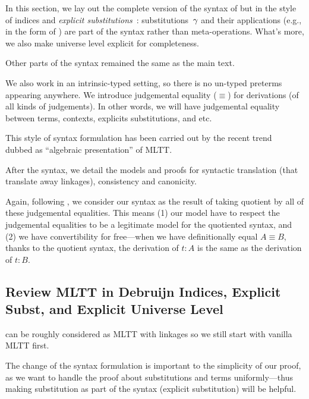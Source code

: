 In this section, we lay out the complete version of the syntax of \TT but in the style of \citeauthor{debruijn1964} indices and \emph{explicit substitutions}~\cite{substcalculus,abadi1989subst}:
substitutions~$\gamma$ and their applications (e.g., in the form of ) are part
of the syntax rather than meta-operations. What's more, we also make universe level explicit for completeness.

Other parts of the syntax remained the same as the main text.  

We also work in an intrinsic-typed setting, so there is no un-typed preterms appearing anywhere. We introduce judgemental equality ($\equiv$)
for derivations (of all kinds of judgements). In other words, we will have judgemental equality between terms, 
contexts, explicits substitutions, and etc. 

This style of syntax formulation has been carried out by the recent trend~\cite{altkap2016,coquand2018canonicity,gratzer-sterling-birkedal-2019} dubbed as ``algebraic presentation'' of MLTT. 


After the syntax, we detail the models and proofs for syntactic translation (that translate away linkages),  consistency and canonicity. 

Again, following \citet{altkap2016,coquand2018canonicity,gratzer-sterling-birkedal-2019}, we consider our syntax as the result of taking quotient by all of these judgemental equalities. This means 
(1) our model have to respect the judgemental equalities to be a legitimate model for the quotiented syntax, and (2) we have convertibility for free---when we have definitionally equal $A \equiv B$, thanks to the quotient syntax, the derivation of $t : A$ is the same as the derivation of $t : B$.


\subsection{Review MLTT in Debruijn Indices, Explicit Subst, and Explicit Universe Level}

\TT can be roughly considered as MLTT with linkages so we still start with vanilla MLTT first.




  The change of the syntax formulation is important to the simplicity of our proof, as we want to handle the proof about substitutions and terms uniformly---thus making substitution as part of the syntax (explicit substitution) will be helpful. 

